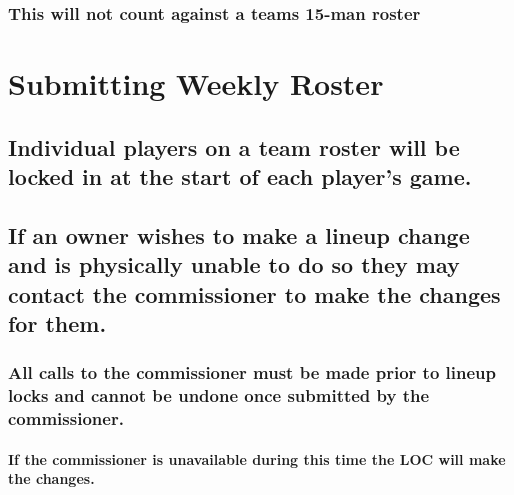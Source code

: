 \documentclass[
]{book}
\begin{document}
\hypertarget{this-will-not-count-against-a-teams-15-man-roster}{%
\subsubsection{This will not count against a teams 15-man roster}\label{this-will-not-count-against-a-teams-15-man-roster}}

\hypertarget{submitting-weekly-roster}{%
\section{Submitting Weekly Roster}\label{submitting-weekly-roster}}

\hypertarget{individual-players-on-a-team-roster-will-be-locked-in-at-the-start-of-each-players-game.}{%
\subsection{Individual players on a team roster will be locked in at the start of each player's game.}\label{individual-players-on-a-team-roster-will-be-locked-in-at-the-start-of-each-players-game.}}

\hypertarget{if-an-owner-wishes-to-make-a-lineup-change-and-is-physically-unable-to-do-so-they-may-contact-the-commissioner-to-make-the-changes-for-them.}{%
\subsection{If an owner wishes to make a lineup change and is physically unable to do so they may contact the commissioner to make the changes for them.}\label{if-an-owner-wishes-to-make-a-lineup-change-and-is-physically-unable-to-do-so-they-may-contact-the-commissioner-to-make-the-changes-for-them.}}

\hypertarget{all-calls-to-the-commissioner-must-be-made-prior-to-lineup-locks-and-cannot-be-undone-once-submitted-by-the-commissioner.}{%
\subsubsection{All calls to the commissioner must be made prior to lineup locks and cannot be undone once submitted by the commissioner.}\label{all-calls-to-the-commissioner-must-be-made-prior-to-lineup-locks-and-cannot-be-undone-once-submitted-by-the-commissioner.}}

\hypertarget{if-the-commissioner-is-unavailable-during-this-time-the-loc-will-make-the-changes.}{%
\paragraph{If the commissioner is unavailable during this time the LOC will make the changes.}\label{if-the-commissioner-is-unavailable-during-this-time-the-loc-will-make-the-changes.}}
\end{document}

